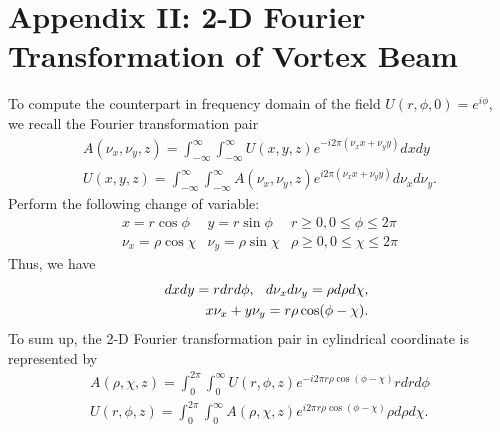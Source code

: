 \section*{Appendix II: 2-D Fourier Transformation of Vortex Beam}
To compute the counterpart in frequency domain of the field $U(r, \phi, 0) = e^{i\phi}$, we recall the Fourier transformation pair
\begin{eqnarray}
	A(\nu_x, \nu_y, z) = \int_{-\infty}^{\infty} \int_{-\infty}^{\infty} U(x, y, z)
	e^{-i 2 \pi (\nu_x x + \nu_y y)} dx dy
	\nonumber\\
	U(x, y, z) = \int_{-\infty}^{\infty} \int_{-\infty}^{\infty} A(\nu_x, \nu_y, z)
	e^{i 2 \pi (\nu_x x + \nu_y y)} d\nu_x d\nu_y.
	\nonumber
\end{eqnarray}
Perform the following change of variable:
\begin{eqnarray}
	x = r\cos\phi & y = r\sin\phi & r \ge 0, 0 \le \phi \le 2\pi
	\nonumber\\
	\nu_x = \rho\cos\chi & \nu_y = \rho\sin\chi & \rho \ge 0, 0 \le \chi \le 2\pi
	\nonumber
\end{eqnarray}
Thus, we have
\begin{eqnarray}
	&&dx dy = r dr d\phi, \hspace{0.1in} d\nu_x d\nu_y = \rho d\rho d\chi,
	\nonumber\\
	&&x\nu_x + y\nu_y = r\rho \cos(\phi - \chi).
	\nonumber
\end{eqnarray}
To sum up, the 2-D Fourier transformation pair in cylindrical coordinate is represented by
\begin{eqnarray}
	A(\rho, \chi, z) = \int_{0}^{2\pi} \int_{0}^{\infty} U(r, \phi, z)
	e^{-i 2 \pi r \rho \cos(\phi - \chi)} r dr d\phi
	\nonumber\\
	U(r, \phi, z) = \int_{0}^{2\pi} \int_{0}^{\infty} A(\rho, \chi, z)
	e^{i 2 \pi r \rho \cos(\phi - \chi)} \rho d\rho d\chi.
	\nonumber
\end{eqnarray}

